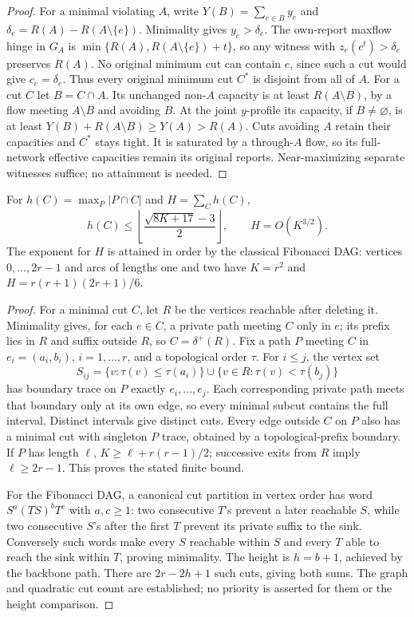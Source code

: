 \begin{proof}
For a minimal violating $A$, write $Y(B)=\sum_{e\in B}y_e$ and
$\delta_e=R(A)-R(A\setminus\{e\})$. Minimality gives $y_e>\delta_e$.
The own-report maxflow hinge in $G_A$ is
$\min\{R(A),R(A\setminus\{e\})+t\}$, so any witness with
$z_e(c^t)>\delta_e$ preserves $R(A)$. No original minimum cut can contain
$e$, since such a cut would give $c_e=\delta_e$. Thus every original
minimum cut $C^*$ is disjoint from all of $A$.
For a cut $C$ let $B=C\cap A$. Its unchanged non-$A$ capacity is at least
$R(A\setminus B)$, by a flow meeting $A\setminus B$ and avoiding $B$.
At the joint $y$-profile its capacity, if $B\ne\varnothing$, is at least
$Y(B)+R(A\setminus B)\ge Y(A)>R(A)$. Cuts avoiding $A$ retain their
capacities and $C^*$ stays tight. It is saturated by a through-$A$ flow,
so its full-network effective capacities remain its original reports.
Near-maximizing separate witnesses suffice; no attainment is needed.
\end{proof}

\begin{proposition}\label{noise:height}
For $h(C)=\max_P|P\cap C|$ and $H=\sum_Ch(C)$,
\[
 h(C)\le\left\lfloor\frac{\sqrt{8K+17}-3}{2}\right\rfloor,
 \qquad H=O(K^{3/2}).
\]
The exponent for $H$ is attained in order by the classical Fibonacci DAG:
vertices $0,\ldots,2r-1$ and arcs of lengths one and two have
$K=r^2$ and $H=r(r+1)(2r+1)/6$.
\end{proposition}
\begin{proof}
For a minimal cut $C$, let $R$ be the vertices reachable after deleting it.
Minimality gives, for each $e\in C$, a private path meeting $C$ only in $e$;
its prefix lies in $R$ and suffix outside $R$, so $C=\delta^+(R)$.
Fix a path $P$ meeting $C$ in $e_i=(a_i,b_i)$, $i=1,\ldots,r$, and a
topological order $\tau$. For $i\le j$, the vertex set
\[
 S_{ij}=\{v:\tau(v)\le\tau(a_i)\}
       \cup\{v\in R:\tau(v)<\tau(b_j)\}
\]
has boundary trace on $P$ exactly $e_i,\ldots,e_j$. Each corresponding
private path meets that boundary only at its own edge, so every minimal
subcut contains the full interval. Distinct intervals give distinct cuts.
Every edge outside $C$ on $P$ also has a minimal cut with singleton $P$ trace,
obtained by a topological-prefix boundary. If $P$ has length $\ell$,
$K\ge\ell+r(r-1)/2$; successive exits from $R$ imply $\ell\ge2r-1$.
This proves the stated finite bound.

For the Fibonacci DAG, a canonical cut partition in vertex order has word
$S^a(TS)^bT^c$ with $a,c\ge1$: two consecutive $T$'s prevent a later
reachable $S$, while two consecutive $S$'s after the first $T$ prevent its
private suffix to the sink. Conversely such words make every $S$ reachable
within $S$ and every $T$ able to reach the sink within $T$, proving minimality.
The height is $h=b+1$, achieved by the backbone path. There are
$2r-2h+1$ such cuts, giving both sums. The graph and quadratic cut count
are established; no priority is asserted for them or the height comparison.
\end{proof}

